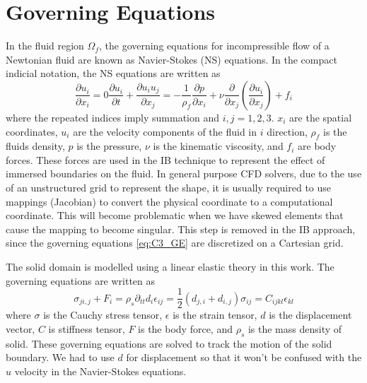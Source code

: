 \section{Governing Equations}
In the fluid region $\Omega_f$, the governing equations for incompressible flow of a Newtonian fluid are known as Navier-Stokes (NS) equations. In the compact indicial notation, the NS equations are written as
%
\begin{subequations}\label{eq:C3_GE}
\begin{equation}\label{eq:C3_continuity}
    \frac{\partial u_i}{\partial x_i} = 0
\end{equation}
\begin{equation}\label{eq:C3_momentum}
    \frac{\partial u_i}{\partial t} + \frac{\partial u_i u_j}{\partial x_j} = 
    -\frac{1}{\rho_f    } \frac{\partial p}{\partial x_i} + 
    \nu \frac{\partial}{\partial x_j} \left( \frac{\partial u_i}{\partial x_j} \right) + 
    f_i
\end{equation}
\end{subequations}
%
where the repeated indices imply summation and $i,j=1,2,3$. $x_i$ are the spatial coordinates, $u_i$ are the velocity components of the fluid in $i$ direction, $\rho_f$ is the fluids density, $p$ is the pressure, $\nu$ is the kinematic viscosity, and $f_i$ are body forces. These forces are used in the IB technique to represent the effect of immersed boundaries on the fluid. In general purpose CFD solvers, due to the use of an unstructured grid to represent the shape, it is usually required to use mappings (Jacobian) to convert the physical coordinate to a computational coordinate. This will become problematic when we have skewed elements that cause the mapping to become singular. This step is removed in the IB approach, since the governing equations \eqref{eq:C3_GE} are discretized on a Cartesian grid.

The solid domain is modelled using a linear elastic theory in this work. The governing equations are written as
%
\begin{subequations}\label{eq:C3_linearEalsticityEquations}
\begin{equation}
    \sigma_{ji,j} + F_i = \rho_s \partial_{tt} d_i
\end{equation}
\begin{equation}
    \epsilon_{ij} = \frac{1}{2} \left( d_{j,i} + d_{i,j} \right)
\end{equation}
\begin{equation}
    \sigma_{ij} = C_{ijkl} \epsilon_{kl}
\end{equation}
\end{subequations}
%
where $\sigma$ is the Cauchy stress tensor, $\epsilon$ is the strain tensor, $d$ is the displacement vector, $C$ is stiffness tensor, $F$ is the body force, and $\rho_s$ is the mass density of solid. These governing equations are solved to track the motion of the solid boundary. We had to use $d$ for displacement so that it won't be confused with the $u$ velocity in the Navier-Stokes equations.

